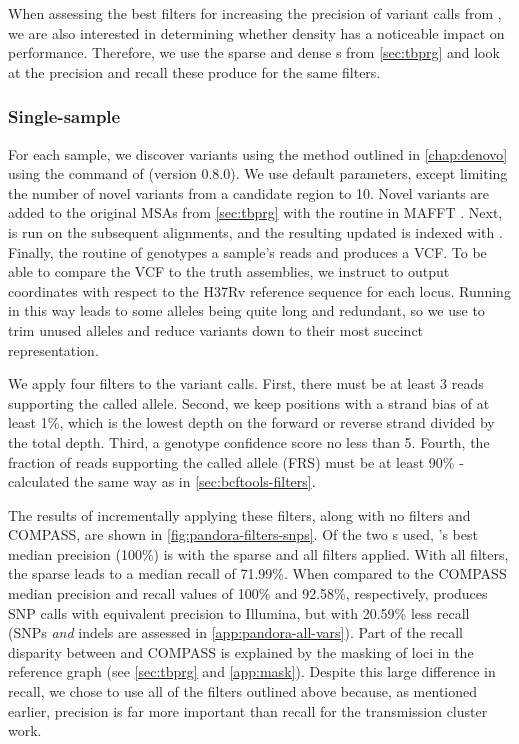 When assessing the best filters for increasing the precision of variant calls from \pandora{}, we are also interested in determining whether \prg{} density has a noticeable impact on performance. Therefore, we use the sparse and dense \prg{}s from \autoref{sec:tbprg} and look at the precision and recall these produce for the same filters.

\subsubsection{Single-sample}
\label{sec:map-var-calls}

For each sample, we discover \denovo{} variants using the method outlined in \autoref{chap:denovo} using the  command of \pandora{} (version 0.8.0). We use default parameters, except limiting the number of novel variants from a candidate region to 10. Novel variants are added to the original MSAs from \autoref{sec:tbprg} with the  routine in MAFFT \cite{katoh2012}. Next, \makeprg{} is run on the subsequent alignments, and the resulting updated \prg{} is indexed with \pandora{}. Finally, the  routine of \pandora{} genotypes a sample's reads and produces a VCF. To be able to compare the \pandora{} VCF to the truth assemblies, we instruct \pandora{} to output coordinates with respect to the H37Rv reference sequence for each locus. Running \pandora{} in this way leads to some alleles being quite long and redundant, so we use  to trim unused alleles and reduce variants down to their most succinct representation. 

We apply four filters to the \pandora{} variant calls. First, there must be at least 3 reads supporting the called allele. Second, we keep positions with a strand bias of at least 1\%, which is the lowest depth on the forward or reverse strand divided by the total depth. Third, a genotype confidence score no less than 5. Fourth, the fraction of reads supporting the called allele (FRS) must be at least 90\%  - calculated the same way as in \autoref{sec:bcftools-filters}.

The results of incrementally applying these filters, along with no filters and COMPASS, are shown in \autoref{fig:pandora-filters-snps}. Of the two \prg{}s used, \pandora{}'s best median precision (100\%) is with the sparse \prg{} and all filters applied. With all filters, the sparse \prg{} leads to a median recall of 71.99\%. When compared to the COMPASS median precision and recall values of 100\% and 92.58\%, respectively, \pandora{} produces \ont{} SNP calls with equivalent precision to Illumina, but with 20.59\% less recall (SNPs \emph{and} indels are assessed in \autoref{app:pandora-all-vars}). Part of the recall disparity between \pandora{} and COMPASS is explained by the masking of loci in the reference graph (see \autoref{sec:tbprg} and \autoref{app:mask}). Despite this large difference in recall, we chose to use all of the filters outlined above because, as mentioned earlier, precision is far more important than recall for the transmission cluster work.


